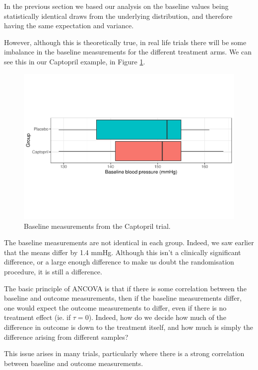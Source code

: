 \documentclass[
  openany]{book}
\theoremstyle{definition}
\theoremstyle{definition}
\theoremstyle{definition}
\theoremstyle{definition}
\theoremstyle{remark}
\begin{document}
In the previous section we based our analysis on the baseline values being statistically identical draws from the underlying distribution, and therefore having the same expectation and variance.

However, although this is theoretically true, in real life trials there will be some imbalance in the baseline measurements for the different treatment arms. We can see this in our Captopril example, in Figure \ref{fig:hommel}.

\begin{figure}
\centering
\includegraphics{CT4H_notes_files/figure-latex/hommel-1.pdf}
\caption{\label{fig:hommel}Baseline measurements from the Captopril trial.}
\end{figure}

The baseline measurements are not identical in each group. Indeed, we saw earlier that the means differ by 1.4 mmHg. Although this isn't a clinically significant difference, or a large enough difference to make us doubt the randomisation procedure, it is still a difference.

The basic principle of ANCOVA is that if there is some correlation between the baseline and outcome measurements, then if the baseline measurements differ, one would expect the outcome measurements to differ, even if there is no treatment effect (ie. if \(\tau=0\)). Indeed, how do we decide how much of the difference in outcome is down to the treatment itself, and how much is simply the difference arising from different samples?

This issue arises in many trials, particularly where there is a strong correlation between baseline and outcome measurements.
\end{document}
